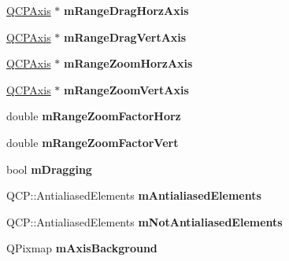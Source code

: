 \begin{DoxyCompactItemize}
\item 
\hypertarget{classQCustomPlot_a8cddba04d1a164b3c3ffd9c1799bef23}{\hyperlink{classQCPAxis}{Q\-C\-P\-Axis} $\ast$ {\bfseries m\-Range\-Drag\-Horz\-Axis}}\label{classQCustomPlot_a8cddba04d1a164b3c3ffd9c1799bef23}

\item 
\hypertarget{classQCustomPlot_aa1daa353f95fd85d148c20e27901ff88}{\hyperlink{classQCPAxis}{Q\-C\-P\-Axis} $\ast$ {\bfseries m\-Range\-Drag\-Vert\-Axis}}\label{classQCustomPlot_aa1daa353f95fd85d148c20e27901ff88}

\item 
\hypertarget{classQCustomPlot_a8f5d4dcb682e1d579603661a93901552}{\hyperlink{classQCPAxis}{Q\-C\-P\-Axis} $\ast$ {\bfseries m\-Range\-Zoom\-Horz\-Axis}}\label{classQCustomPlot_a8f5d4dcb682e1d579603661a93901552}

\item 
\hypertarget{classQCustomPlot_ae10772213af61244b48b741268bd060f}{\hyperlink{classQCPAxis}{Q\-C\-P\-Axis} $\ast$ {\bfseries m\-Range\-Zoom\-Vert\-Axis}}\label{classQCustomPlot_ae10772213af61244b48b741268bd060f}

\item 
\hypertarget{classQCustomPlot_a23a57c59cfbb46e9d1c6e9a51bfa6daf}{double {\bfseries m\-Range\-Zoom\-Factor\-Horz}}\label{classQCustomPlot_a23a57c59cfbb46e9d1c6e9a51bfa6daf}

\item 
\hypertarget{classQCustomPlot_a58ec881b605d7ea63cfc8480956739a1}{double {\bfseries m\-Range\-Zoom\-Factor\-Vert}}\label{classQCustomPlot_a58ec881b605d7ea63cfc8480956739a1}

\item 
\hypertarget{classQCustomPlot_ab62a1f63fe3a133e8caabf1254ddaaaf}{bool {\bfseries m\-Dragging}}\label{classQCustomPlot_ab62a1f63fe3a133e8caabf1254ddaaaf}

\item 
\hypertarget{classQCustomPlot_aa333200629256830e273873b582a5524}{Q\-C\-P\-::\-Antialiased\-Elements {\bfseries m\-Antialiased\-Elements}}\label{classQCustomPlot_aa333200629256830e273873b582a5524}

\item 
\hypertarget{classQCustomPlot_a2b6ebcad00a90ba07f146cefcd4293da}{Q\-C\-P\-::\-Antialiased\-Elements {\bfseries m\-Not\-Antialiased\-Elements}}\label{classQCustomPlot_a2b6ebcad00a90ba07f146cefcd4293da}

\item 
\hypertarget{classQCustomPlot_a89818035f469822c7efa0bf1b4a0af92}{Q\-Pixmap {\bfseries m\-Axis\-Background}}\label{classQCustomPlot_a89818035f469822c7efa0bf1b4a0af92}


\end{DoxyCompactItemize}
